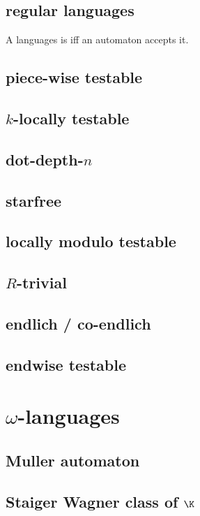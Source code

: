 


\subsection{regular languages}
A languages is  iff an automaton accepts it.

\subsection{piece-wise testable}
\subsection{$k$-locally testable}
\subsection{dot-depth-$n$}
\subsection{starfree}
\subsection{locally modulo testable}
\subsection{$R$-trivial}
\subsection{endlich / co-endlich}
\subsection{endwise testable}

\section{$\omega$-languages}

\subsection{Muller automaton}

\subsection{Staiger Wagner class of $\K$}

